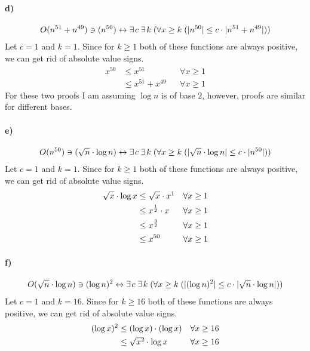 \documentclass[12pt]{article}
\newcommand\+{\mkern2mu}
\begin{document}
\paragraph{d)}
\begin{gather*}
O(n^{51}+n^{49}) \ni (n^{50}) \leftrightarrow \exists \+ c \; \exists \+ k \; (\forall x \geq k \; (\vert n^{50} \vert \leq c \cdot \vert n^{51}+n^{49} \vert))
\end{gather*}
Let $c = 1$ and $k = 1$.
Since for $k \geq 1$ both of these functions are always positive, we can get rid of absolute value signs.
\begin{align*}
x^{50} &\leq x^{51} && \forall x \geq 1 \\
&\leq x^{51}+x^{49} && \forall x \geq 1
\end{align*}
For these two proofs I am assuming $\log{n}$ is of base $2$, however, proofs are similar for different bases.
\paragraph{e)}
\begin{gather*}
O(n^{50}) \ni (\sqrt{n} \cdot \log{n}) \leftrightarrow \exists \+ c \; \exists \+ k \; (\forall x \geq k \; (\vert \sqrt{n} \cdot \log{n} \vert \leq c \cdot \vert n^{50} \vert))
\end{gather*}
Let $c = 1$ and $k = 1$.
Since for $k \geq 1$ both of these functions are always positive, we can get rid of absolute value signs.
\begin{align*}
\sqrt{x} \cdot \log{x} &\leq \sqrt{x} \cdot x\footnotemark && \forall x \geq 1 \\
&\leq x^{\frac{1}{2}} \cdot x && \forall x \geq 1 \\
&\leq x^{\frac{3}{2}} && \forall x \geq 1 \\
&\leq x^{50} && \forall x \geq 1
\end{align*}
\paragraph{f)}
\begin{gather*}
O(\sqrt{n} \cdot \log{n}) \ni (\log{n})^2 \leftrightarrow \exists \+ c \; \exists \+ k \; (\forall x \geq k \; (\vert (\log{n})^2 \vert \leq c \cdot \vert \sqrt{n} \cdot \log{n} \vert))
\end{gather*}
Let $c = 1$ and $k = 16$.
Since for $k \geq 16$ both of these functions are always positive, we can get rid of absolute value signs.
\begin{align*}
(\log{x})^2 &\leq (\log{x}) \cdot (\log{x}) && \forall x \geq 16 \\
&\leq \sqrt{x}\footnotemark \cdot \log{x} && \forall x \geq 16
\end{align*}
\end{document}
